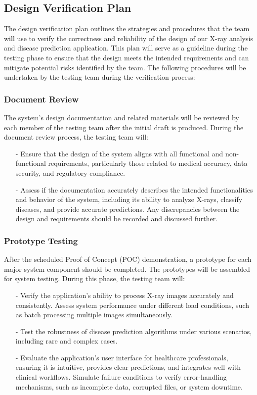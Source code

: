 \documentclass[12pt, titlepage]{article}
\begin{document}
\subsection{Design Verification Plan}

The design verification plan outlines the strategies and procedures that the team will use to verify the correctness and reliability of the design of our X-ray analysis and disease prediction application. This plan will serve as a guideline during the testing phase to ensure that the design meets the intended requirements and can mitigate potential risks identified by the team. The following procedures will be undertaken by the testing team during the verification process:

\subsubsection{Document Review}
The system's design documentation and related materials will be reviewed by each member of the testing team after the initial draft is produced. During the document review process, the testing team will:
\begin{itemize}
\item[-] Ensure that the design of the system aligns with all functional and non-functional requirements, particularly those related to medical accuracy, data security, and regulatory compliance.
\item[-] Assess if the documentation accurately describes the intended functionalities and behavior of the system, including its ability to analyze X-rays, classify diseases, and provide accurate predictions. Any discrepancies between the design and requirements should be recorded and discussed further.
\end{itemize}

\subsubsection{Prototype Testing}
After the scheduled Proof of Concept (POC) demonstration, a prototype for each major system component should be completed. The prototypes will be assembled for system testing. During this phase, the testing team will:
\begin{itemize}
\item[-] Verify the application's ability to process X-ray images accurately and consistently.
Assess system performance under different load conditions, such as batch processing multiple images simultaneously.
\item[-] Test the robustness of disease prediction algorithms under various scenarios, including rare and complex cases.
\item[-] Evaluate the application's user interface for healthcare professionals, ensuring it is intuitive, provides clear predictions, and integrates well with clinical workflows.
Simulate failure conditions to verify error-handling mechanisms, such as incomplete data, corrupted files, or system downtime.
\end{itemize}
\end{document}
